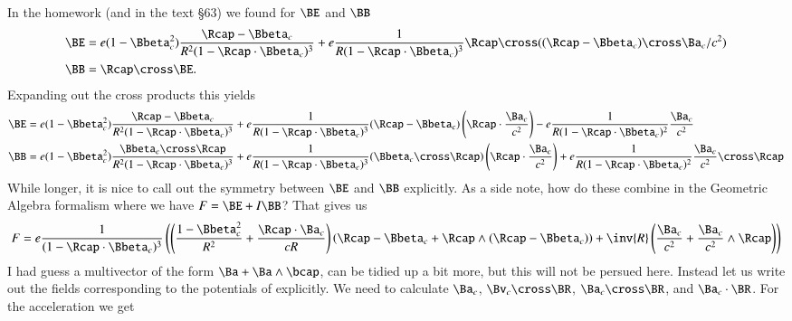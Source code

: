 {In the homework (and in the text \citep{landau1980classical} \S 63) we found for \(\BE\) and \(\BB\)
%
\begin{equation}\label{eqn:relativisticElectrodynamicsExamReflection:920}
\begin{aligned}
\BE &= e (1 - \Bbeta_c^2) \frac{\Rcap - \Bbeta_c}{R^2 (1 - \Rcap \cdot \Bbeta_c)^3}
+ e \frac{1}{R (1 - \Rcap \cdot \Bbeta_c)^3} \Rcap \cross ((\Rcap - \Bbeta_c) \cross \Ba_c/c^2) \\
\BB &= \Rcap \cross \BE.
\end{aligned}
\end{equation}
%
Expanding out the cross products this yields
%
\begin{equation}\label{eqn:relativisticElectrodynamicsExamReflection:930}
\begin{aligned}
\BE
&= e (1 - \Bbeta_c^2) \frac{\Rcap - \Bbeta_c}{R^2 (1 - \Rcap \cdot \Bbeta_c)^3}
+ e \frac{1}{R (1 - \Rcap \cdot \Bbeta_c)^3} (\Rcap - \Bbeta_c) \left(\Rcap \cdot \frac{\Ba_c}{c^2}\right)
- e \frac{1}{R (1 - \Rcap \cdot \Bbeta_c)^2} \frac{\Ba_c}{c^2} \\
\BB
&= e (1 - \Bbeta_c^2) \frac{\Bbeta_c \cross \Rcap}{R^2 (1 - \Rcap \cdot \Bbeta_c)^3}
+ e \frac{1}{R (1 - \Rcap \cdot \Bbeta_c)^3} (\Bbeta_c \cross \Rcap) \left(\Rcap \cdot \frac{\Ba_c}{c^2} \right)
+ e \frac{1}{R (1 - \Rcap \cdot \Bbeta_c)^2} \frac{\Ba_c}{c^2} \cross \Rcap
\end{aligned}
\end{equation}
%
While longer, it is nice to call out the symmetry between \(\BE\) and \(\BB\) explicitly.  As a side note, how do these combine in the Geometric Algebra formalism where we have \(F = \BE + I\BB\)?  That gives us
%
\begin{equation}\label{eqn:relativisticElectrodynamicsExamReflection:935}
F =
e \frac{1}{(1 - \Rcap \cdot \Bbeta_c)^3}
\left(
\left(
\frac{1 - \Bbeta_c^2}{R^2} + \frac{\Rcap \cdot \Ba_c}{c R}
\right)
\left(
\Rcap - \Bbeta_c + \Rcap \wedge (\Rcap - \Bbeta_c)
\right)
+ \inv{R} \left(
\frac{\Ba_c}{c^2}
+ \frac{\Ba_c}{c^2} \wedge \Rcap
\right)
\right)
\end{equation}
%
I had guess a multivector of the form \(\Ba + \Ba \wedge \bcap\), can be tidied up a bit more, but this will not be persued here.  Instead let us write out the fields corresponding to the potentials of  explicitly.  We need to calculate \(\Ba_c\), \(\Bv_c \cross \BR\), \(\Ba_c \cross \BR\), and \(\Ba_c \cdot \BR\).  For the acceleration we get
}
